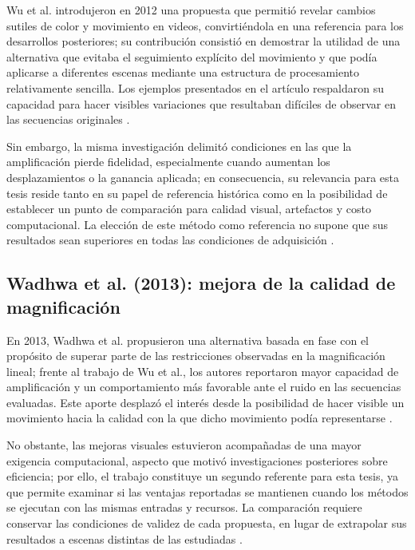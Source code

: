 Wu et al. introdujeron en 2012 una propuesta que permitió revelar cambios sutiles de color y movimiento en videos, convirtiéndola en una referencia para los desarrollos posteriores; su contribución consistió en demostrar la utilidad de una alternativa que evitaba el seguimiento explícito del movimiento y que podía aplicarse a diferentes escenas mediante una estructura de procesamiento relativamente sencilla. Los ejemplos presentados en el artículo respaldaron su capacidad para hacer visibles variaciones que resultaban difíciles de observar en las secuencias originales \cite{wu2012eulerian}.

Sin embargo, la misma investigación delimitó condiciones en las que la amplificación pierde fidelidad, especialmente cuando aumentan los desplazamientos o la ganancia aplicada; en consecuencia, su relevancia para esta tesis reside tanto en su papel de referencia histórica como en la posibilidad de establecer un punto de comparación para calidad visual, artefactos y costo computacional. La elección de este método como referencia no supone que sus resultados sean superiores en todas las condiciones de adquisición \cite{wu2012eulerian,ahmed2023overview}.

\subsection{Wadhwa et al. (2013): mejora de la calidad de magnificación}

En 2013, Wadhwa et al. propusieron una alternativa basada en fase con el propósito de superar parte de las restricciones observadas en la magnificación lineal; frente al trabajo de Wu et al., los autores reportaron mayor capacidad de amplificación y un comportamiento más favorable ante el ruido en las secuencias evaluadas. Este aporte desplazó el interés desde la posibilidad de hacer visible un movimiento hacia la calidad con la que dicho movimiento podía representarse \cite{wadhwa2013phase}.

No obstante, las mejoras visuales estuvieron acompañadas de una mayor exigencia computacional, aspecto que motivó investigaciones posteriores sobre eficiencia; por ello, el trabajo constituye un segundo referente para esta tesis, ya que permite examinar si las ventajas reportadas se mantienen cuando los métodos se ejecutan con las mismas entradas y recursos. La comparación requiere conservar las condiciones de validez de cada propuesta, en lugar de extrapolar sus resultados a escenas distintas de las estudiadas \cite{wadhwa2013phase,wadhwa2014riesz}.

